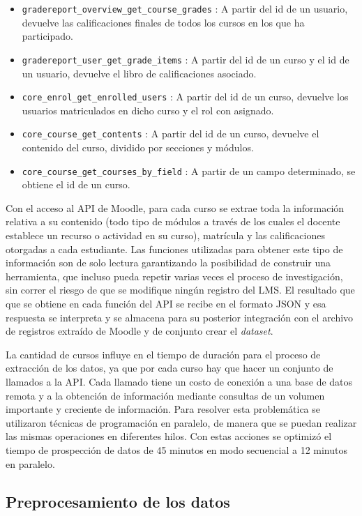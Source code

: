 \begin{itemize}
    \item \texttt{gradereport\_overview\_get\_course\_grades} : A partir del id de un usuario, devuelve las calificaciones finales de todos los cursos en los que ha participado.
    \item \texttt{gradereport\_user\_get\_grade\_items} : A partir del id de un curso y el id de un usuario, devuelve el libro de calificaciones asociado.
    \item \texttt{core\_enrol\_get\_enrolled\_users} : A partir del id de un curso, devuelve los usuarios matriculados en dicho curso y el rol con asignado.
    \item \texttt{core\_course\_get\_contents} : A partir del id de un curso, devuelve el contenido del curso, dividido por secciones y módulos.
    \item \texttt{core\_course\_get\_courses\_by\_field} : A partir de un campo determinado, se obtiene el id de un curso.
\end{itemize}
    
Con el acceso al API de Moodle, para cada curso se extrae toda la información relativa a su contenido (todo tipo de módulos a través de los cuales el docente establece un recurso o actividad en su curso), matrícula y las calificaciones otorgadas a cada estudiante. Las funciones utilizadas para obtener este tipo de información son de solo lectura garantizando la posibilidad de construir una herramienta, que incluso pueda repetir varias veces el proceso de investigación, sin correr el riesgo de que se modifique ningún registro del LMS. El resultado que que se obtiene en cada función del API se recibe en el formato JSON y esa respuesta se interpreta y se almacena para su posterior integración con el archivo de registros extraído de Moodle y de conjunto crear el \textit{dataset}. 

La cantidad de cursos influye en el tiempo de duración para el proceso de extracción de los datos, ya que por cada curso hay que hacer un conjunto de llamados a la API. Cada llamado tiene un costo de conexión a una base de datos remota y a la obtención de información mediante consultas de un volumen importante y creciente de información. Para resolver esta problemática se utilizaron técnicas de programación en paralelo, de manera que se puedan realizar las mismas operaciones en diferentes hilos. Con estas acciones se optimizó el tiempo de prospección de datos de 45 minutos en modo secuencial a 12 minutos en paralelo.
\subsection{Preprocesamiento de los datos}

